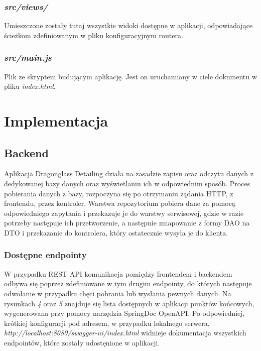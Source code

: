 \documentclass[11pt,a4paper]{article}
\begin{document}
\subsubsection{\textsl{src/views/}}
Umieszczone zostały tutaj wszystkie widoki dostępne w aplikacji, odpowiadające ścieżkom zdefiniowanym w pliku konfiguracyjnym routera. 

\subsubsection{\textsl{src/main.js}}
Plik ze skryptem budującym aplikację. Jest on uruchamiany w ciele dokumentu w pliku \textsl{index.html}.

\newpage
\section{Implementacja}
    
\subsection{Backend}

Aplikacja Dragonglass Detailing działa na zasadzie zapisu oraz odczytu danych z dedykowanej bazy danych oraz wyświetlaniu ich w odpowiednim sposób. Proces pobierania danych z bazy, rozpoczyna się po otrzymaniu żądania HTTP, z frontendu, przez kontroler. Warstwa repozytorium pobiera dane za pomocą odpowiedniego zapytania i przekazuje je do warstwy serwisowej, gdzie w razie potrzeby następuje ich przetworzenie, a następnie zmapowanie z formy DAO na DTO i przekazanie do kontrolera, który ostatecznie wysyła je do klienta.

\subsubsection{Dostępne endpointy}

W przypadku REST API komunikacja pomiędzy frontendem i backendem odbywa się poprzez zdefiniowane w tym drugim endpointy, do których następuje odwołanie w przypadku chęci pobrania lub wysłania pewnych danych. Na rysunkach \textsl{4} oraz \textsl{5} znajduje się lista dostępnych w aplikacji punktów końcowych, wygenerowana przy pomocy narzędzia SpringDoc OpenAPI. Po odpowiedniej, krótkiej konfiguracji pod adresem, w przypadku lokalnego serwera, \textsl{http://localhost:8080/swagger-ui/index.html} widnieje dokumentacja wszystkich endpointów, które zostały udostęnione w aplikacji.
\end{document}
